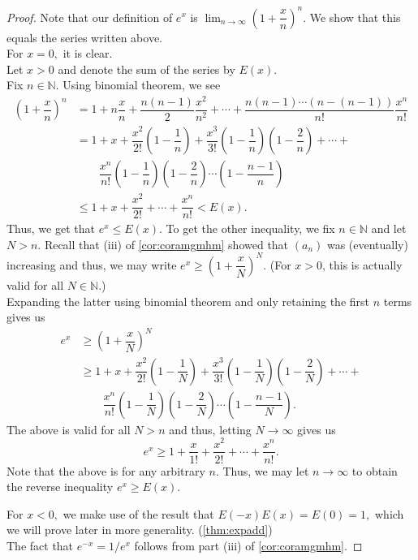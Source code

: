 \expdef*\label{thm:expdef2}
\begin{flushright}\hyperref[thm:expdef]{\upsym}\end{flushright}
\begin{proof}
	Note that our definition of $e^x$ is $\displaystyle\lim_{n\to \infty}\left(1 + \dfrac{x}{n}\right)^n.$ We show that this equals the series written above.\\
	For $x = 0,$ it is clear.\\
	Let $x > 0$ and denote the sum of the series by $E(x).$ \\
	Fix $n \in \mathbb{N}.$ Using binomial theorem, we see
	\begin{align*} 
		\left(1 + \dfrac{x}{n}\right)^n &= 1 + n\dfrac{x}{n} + \dfrac{n(n - 1)}{2}\dfrac{x^2}{n^2} + \cdots + \dfrac{n(n-1)\cdots(n - (n-1))}{n!}\dfrac{x^n}{n!}\\
		&= 1 + x + \dfrac{x^2}{2!}\left(1 - \dfrac{1}{n}\right) + \dfrac{x^3}{3!}\left(1 - \dfrac{1}{n}\right)\left(1 - \dfrac{2}{n}\right) + \cdots + \\
		& \qquad \dfrac{x^n}{n!}\left(1 - \dfrac{1}{n}\right)\left(1 - \dfrac{2}{n}\right)\cdots\left(1 - \dfrac{n-1}{n}\right)\\
		&\le 1 + x + \dfrac{x^2}{2!} + \cdots + \dfrac{x^n}{n!} < E(x).
	\end{align*} 
	Thus, we get that $e^x \le E(x).$ To get the other inequality, we fix $n \in \mathbb{N}$ and let $N > n.$ Recall that (iii) of \cref{cor:coramgmhm} showed that $(a_n)$ was (eventually) increasing and thus, we may write $e^x \ge \left(1 + \dfrac{x}{N}\right)^N.$ (For $x>0$, this is actually valid for all $N \in \mathbb{N}$.)\\
	Expanding the latter using binomial theorem and only retaining the first $n$ terms gives us
	\begin{align*} 
		e^x &\ge \left(1 + \dfrac{x}{N}\right)^N\\
		&\ge 1 + x + \dfrac{x^2}{2!}\left(1 - \dfrac{1}{N}\right) + \dfrac{x^3}{3!}\left(1 - \dfrac{1}{N}\right)\left(1 - \dfrac{2}{N}\right) + \cdots + \\
		& \qquad \dfrac{x^n}{n!}\left(1 - \dfrac{1}{N}\right)\left(1 - \dfrac{2}{N}\right)\cdots\left(1 - \dfrac{n-1}{N}\right).
	\end{align*}
	The above is valid for all $N > n$ and thus, letting $N \to \infty$ gives us
	\begin{equation*} 
		e^x \ge 1 + \dfrac{x}{1!} + \dfrac{x^2}{2!} + \cdots + \dfrac{x^n}{n!}.
	\end{equation*}
	Note that the above is for any arbitrary $n.$ Thus, we may let $n \to \infty$ to obtain the reverse inequality $e^x \ge E(x).$

	For $x < 0,$ we make use of the result that $E(-x)E(x) = E(0) = 1,$ which we will prove later in more generality. (\cref{thm:expadd})\\
	The fact that $e^{-x} = 1/e^x$ follows from part (iii) of \cref{cor:coramgmhm}.
\end{proof}


